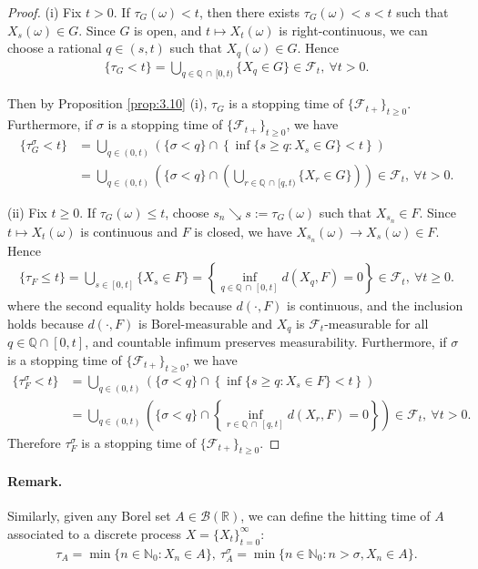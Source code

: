 \documentclass{article}
\numberwithin{equation}{section}
\theoremstyle{plain}
\theoremstyle{definition}
\begin{document}
\begin{proof}
(i) Fix $t>0$. If $\tau_G(\omega)<t$, then there exists $\tau_G(\omega)<s<t$ such that $X_s(\omega)\in G$. Since $G$ is open, and $t\mapsto X_t(\omega)$ is right-continuous, we can choose a rational $q\in(s,t)$ such that $X_q(\omega)\in G$. Hence
\begin{align*}
	\{\tau_G < t\} = \bigcup_{q\in\mathbb{Q}\,\cap\,[0,t)}\{X_q\in G\}\in\mathscr{F}_t,\ \forall t>0.
\end{align*}

Then by Proposition \ref{prop:3.10} (i), $\tau_G$ is a stopping time of $\{\mathscr{F}_{t+}\}_{t\geq 0}$. Furthermore, if $\sigma$ is a stopping time of $\{\mathscr{F}_{t+}\}_{t\geq 0}$, we have
\begin{align*}
	\{\tau_G^\sigma<t\}&=\bigcup_{q\in(0,t)}\left(\{\sigma < q\}\cap\left\{\inf\{s\geq q:X_s\in G\}<t\right\}\right)\\
	&=\bigcup_{q\in(0,t)}\left(\{\sigma < q\}\cap\left(\bigcup_{r\in\mathbb{Q}\,\cap\,[q,t)}\{X_r\in G\}\right)\right)\in\mathscr{F}_t,\ \forall t>0.
\end{align*}

(ii) Fix $t\geq 0$. If $\tau_G(\omega)\leq t$, choose $s_n\searrow s:=\tau_G(\omega)$ such that $X_{s_n}\in F$. Since $t\mapsto X_t(\omega)$ is continuous and $F$ is closed, we have $X_{s_n}(\omega)\to X_s(\omega)\in F$. Hence
\begin{align*}
	\{\tau_F\leq t\}=\bigcup_{s\in[0,t]}\{X_s\in F\} = \left\{\inf_{q\in\mathbb{Q}\,\cap\,[0,t]} d(X_q,F)=0\right\}\in\mathscr{F}_t,\ \forall t\geq 0.
\end{align*}
where the second equality holds because $d(\cdot,F)$ is continuous, and the inclusion holds because $d(\cdot,F)$ is Borel-measurable and $X_q$ is $\mathscr{F}_t$-measurable for all $q\in\mathbb{Q}\cap[0,t]$, and countable infimum preserves measurability. Furthermore, if $\sigma$ is a stopping time of $\{\mathscr{F}_{t+}\}_{t\geq 0}$, we have
\begin{align*}
	\{\tau_F^\sigma<t\}&=\bigcup_{q\in(0,t)}\left(\{\sigma < q\}\cap\left\{\inf\{s\geq q:X_s\in F\}<t\right\}\right)\\
	&=\bigcup_{q\in(0,t)}\left(\{\sigma < q\}\cap\left\{\inf_{r\in\mathbb{Q}\,\cap\,[q,t]} d(X_r,F)=0\right\}\right)\in\mathscr{F}_t,\ \forall t>0.
\end{align*}
Therefore $\tau_F^\sigma$ is a stopping time of $\{\mathscr{F}_{t+}\}_{t\geq 0}$.
\end{proof}
\paragraph{Remark.} Similarly, given any Borel set $A\in\mathscr{B}(\mathbb{R})$, we can define the hitting time of $A$ associated to a discrete process $X=\{X_t\}_{t=0}^\infty$:
\begin{align*}
	\tau_A=\min\{n\in\mathbb{N}_0:X_n\in A\},\ \tau_A^\sigma=\min\{n\in\mathbb{N}_0:n>\sigma, X_n\in A\}.
\end{align*}
\end{document}
